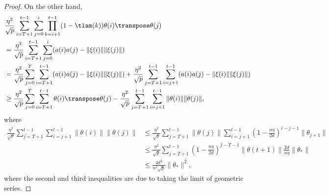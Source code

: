 \begin{proof}
    On the other hand, 
    \begin{align*}
        & \frac{\eta^2}{\sqrt p}\sum_{i=T+1}^{t-1}\sum_{j=0}^i\prod_{k=i+1}^{t-1}(1-\tlam(k)) \theta(i)\transpose\theta(j) \\
        & = \frac{\eta^2}{\sqrt p}\sum_{i=T+1}^{t-1}\sum_{j=0}^i (a(i) a(j) - \|\xi(i)\|\|\xi(j)\|) \\
        & = \frac{\eta^2}{\sqrt p}\sum_{j=0}^T \sum_{i=T+1}^{t-1} (a(i) a(j) - \|\xi(i)\|\|\xi(j)\|) + \frac{\eta^2}{\sqrt p} \sum_{j=T+1}^{t-1} \sum_{i=j+1}^{t-1} (a(i) a(j) - \|\xi(i)\|\|\xi(j)\|) \\
        & \geq \frac{\eta^2}{\sqrt p}\sum_{j=0}^T \sum_{i=T+1}^{t-1} \theta(i)\transpose\theta(j) - \frac{\eta^2}{\sqrt p} \sum_{j=T+1}^{t-1} \sum_{i=j+1}^{t-1} \|\theta(i)\|\|\theta(j)\|,
    \end{align*}
    where
    \begin{align*}
        \frac{\eta^2}{\sqrt p} \sum_{j=T+1}^{t-1} \sum_{i=j+1}^{t-1} \|\theta(i)\|\|\theta(j)\| & \leq \frac{\eta^2}{\sqrt p} \sum_{j=T+1}^{t-1} \|\theta(j)\| \sum_{i=j+1}^{t-1} \left( 1-\frac{n\eta}{2d} \right)^{i-j-1} \|\theta_{j+1}\| \\
        & \leq \frac{\eta^2}{\sqrt p} \sum_{j=T+1}^{t-1} \left( 1-\frac{n\eta}{2d} \right)^{j-T-1} \|\theta(t+1)\| \frac{2d}{n\eta} \|\theta_*\| \\
        & \leq \frac{4d^2}{n^2\sqrt{p}} \|\theta_*\|^2,
    \end{align*}
    where the second and third inequalities are due to taking the limit of geometric series.
    

\end{proof}
